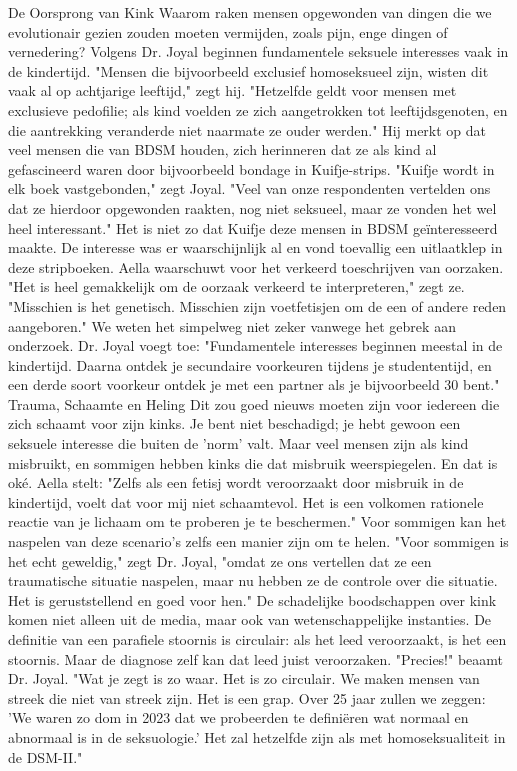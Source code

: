 De Oorsprong van Kink
Waarom raken mensen opgewonden van dingen die we evolutionair gezien zouden moeten vermijden, zoals pijn, enge dingen of vernedering? Volgens Dr. Joyal beginnen fundamentele seksuele interesses vaak in de kindertijd. "Mensen die bijvoorbeeld exclusief homoseksueel zijn, wisten dit vaak al op achtjarige leeftijd," zegt hij. "Hetzelfde geldt voor mensen met exclusieve pedofilie; als kind voelden ze zich aangetrokken tot leeftijdsgenoten, en die aantrekking veranderde niet naarmate ze ouder werden." Hij merkt op dat veel mensen die van BDSM houden, zich herinneren dat ze als kind al gefascineerd waren door bijvoorbeeld bondage in Kuifje-strips. "Kuifje wordt in elk boek vastgebonden," zegt Joyal. "Veel van onze respondenten vertelden ons dat ze hierdoor opgewonden raakten, nog niet seksueel, maar ze vonden het wel heel interessant."
Het is niet zo dat Kuifje deze mensen in BDSM geïnteresseerd maakte. De interesse was er waarschijnlijk al en vond toevallig een uitlaatklep in deze stripboeken. Aella waarschuwt voor het verkeerd toeschrijven van oorzaken. "Het is heel gemakkelijk om de oorzaak verkeerd te interpreteren," zegt ze. "Misschien is het genetisch. Misschien zijn voetfetisjen om de een of andere reden aangeboren." We weten het simpelweg niet zeker vanwege het gebrek aan onderzoek.
Dr. Joyal voegt toe: "Fundamentele interesses beginnen meestal in de kindertijd. Daarna ontdek je secundaire voorkeuren tijdens je studententijd, en een derde soort voorkeur ontdek je met een partner als je bijvoorbeeld 30 bent."
Trauma, Schaamte en Heling
Dit zou goed nieuws moeten zijn voor iedereen die zich schaamt voor zijn kinks. Je bent niet beschadigd; je hebt gewoon een seksuele interesse die buiten de 'norm' valt. Maar veel mensen zijn als kind misbruikt, en sommigen hebben kinks die dat misbruik weerspiegelen. En dat is oké. Aella stelt: "Zelfs als een fetisj wordt veroorzaakt door misbruik in de kindertijd, voelt dat voor mij niet schaamtevol. Het is een volkomen rationele reactie van je lichaam om te proberen je te beschermen."
Voor sommigen kan het naspelen van deze scenario's zelfs een manier zijn om te helen. "Voor sommigen is het echt geweldig," zegt Dr. Joyal, "omdat ze ons vertellen dat ze een traumatische situatie naspelen, maar nu hebben ze de controle over die situatie. Het is geruststellend en goed voor hen."
De schadelijke boodschappen over kink komen niet alleen uit de media, maar ook van wetenschappelijke instanties. De definitie van een parafiele stoornis is circulair: als het leed veroorzaakt, is het een stoornis. Maar de diagnose zelf kan dat leed juist veroorzaken. "Precies!" beaamt Dr. Joyal. "Wat je zegt is zo waar. Het is zo circulair. We maken mensen van streek die niet van streek zijn. Het is een grap. Over 25 jaar zullen we zeggen: 'We waren zo dom in 2023 dat we probeerden te definiëren wat normaal en abnormaal is in de seksuologie.' Het zal hetzelfde zijn als met homoseksualiteit in de DSM-II."
